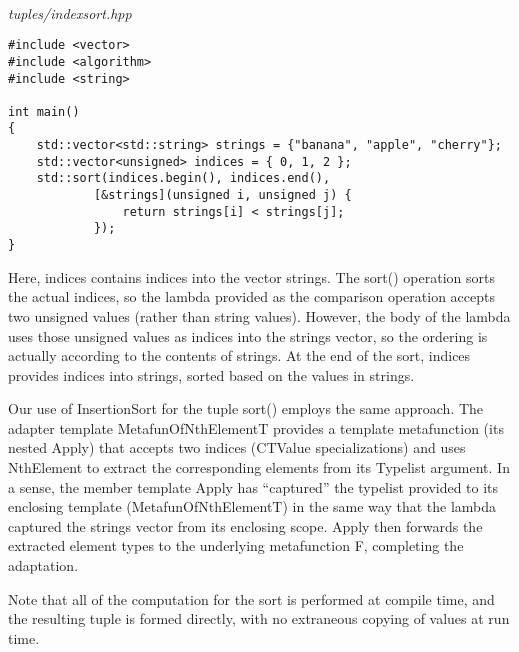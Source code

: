 \hspace*{\fill} \\ %
\noindent
\textit{tuples/indexsort.hpp}
\begin{lstlisting}[style=styleCXX]
#include <vector>
#include <algorithm>
#include <string>

int main()
{
	std::vector<std::string> strings = {"banana", "apple", "cherry"};
	std::vector<unsigned> indices = { 0, 1, 2 };
	std::sort(indices.begin(), indices.end(),
			[&strings](unsigned i, unsigned j) {
				return strings[i] < strings[j];
			});
}
\end{lstlisting}

Here, indices contains indices into the vector strings. The sort() operation sorts the actual indices, so the lambda provided as the comparison operation accepts two unsigned values (rather than string values). However, the body of the lambda uses those unsigned values as indices into the strings vector, so the ordering is actually according to the contents of strings. At the end of the sort, indices provides indices into strings, sorted based on the values in strings.

Our use of InsertionSort for the tuple sort() employs the same approach. The adapter template MetafunOfNthElementT provides a template metafunction (its nested Apply) that accepts two indices (CTValue specializations) and uses NthElement to extract the corresponding elements from its Typelist argument. In a sense, the member template Apply has “captured” the typelist provided to its enclosing template (MetafunOfNthElementT) in the same way that the lambda captured the strings vector from its enclosing scope. Apply then forwards the extracted element types to the underlying metafunction F, completing the adaptation.

Note that all of the computation for the sort is performed at compile time, and the resulting tuple is formed directly, with no extraneous copying of values at run time.

















